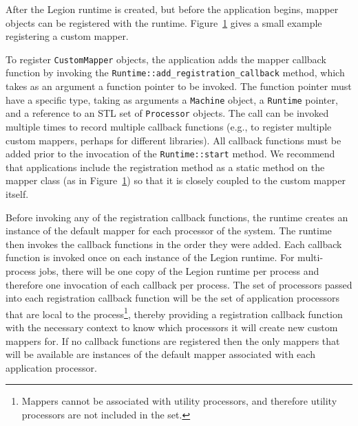 After the Legion runtime is created, but before the application 
begins, mapper objects can be registered 
with the runtime. Figure~\ref{fig:mapper_registration} gives a small
example registering a custom mapper.

\begin{figure}
{  \small
  
  }
\caption{}
\label{fig:mapper_registration}
\end{figure}

To register {\tt CustomMapper} objects, the
application adds the mapper callback function by invoking the
{\tt Runtime::add\_registration\_callback} method, which takes as an
argument a function pointer to be invoked. The function pointer must
have a specific type, taking as arguments a {\tt Machine} object, 
a {\tt Runtime} pointer, and a reference to an STL set of {\tt Processor}
objects. The call can be invoked multiple times to record multiple
callback functions (e.g., to register multiple custom mappers, perhaps for different libraries). All
callback functions must be added prior to the invocation of the 
{\tt Runtime::start} method. We recommend that applications include the registration
method as a static method on the mapper class (as in Figure~\ref{fig:mapper_registration})
so that it is closely coupled to the custom mapper itself.

Before invoking any of the registration callback functions, the runtime 
creates an instance of the default mapper for each processor of
the system. The runtime then invokes the callback functions in the order
they were added. Each callback function is invoked once on each 
instance of the Legion runtime. For multi-process jobs, there will be 
one copy of the Legion runtime per process and therefore one invocation
of each callback per process. The set of processors passed into each 
registration callback function will be the set of application processors 
that are local to the process\footnote{Mappers cannot be associated with
utility processors, and therefore utility processors are not included
in the set.}, thereby providing a registration callback
function with the necessary context to know which processors it
will create new custom mappers for. 
If no callback functions are registered then the only mappers
that will be available are instances of the default mapper associated
with each application processor.

